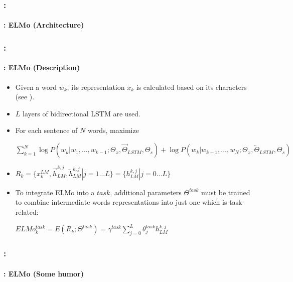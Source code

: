 \documentclass[xcolor=table]{beamer}
\begin{document}
\begin{frame}
	\frametitle{\insertshortsubtitle: \insertsection}
	\framesubtitle{\insertsubsection: ELMo (Architecture)}
	\vspace{-4pt}
	
\end{frame}

\begin{frame}
	\frametitle{\insertshortsubtitle: \insertsection}
	\framesubtitle{\insertsubsection: ELMo (Description)}

	\begin{itemize}
		\item Given a word $w_k$, its representation $x_k$ is calculated based on its characters (see \cite{2015-kim-al}).
		\item $L$ layers of bidirectional LSTM are used. 
		\item For each sentence of $N$ words, maximize\\ 
		\begin{center}
			$\sum_{k=1}^{N} 
		\log P(w_k | w_1,\ldots,w_{k-1}; \Theta_x, \overrightarrow{\Theta}_{LSTM}, \Theta_s)
		+
		\log P(w_k | w_{k+1},\ldots,w_{N}; \Theta_x, \overleftarrow{\Theta}_{LSTM}, \Theta_s)
		$
		\end{center}
		
		\item $R_k = \{x_k^{LM}, \overrightarrow{h}_{LM}^{k, j}, \overleftarrow{h}_{LM}^{k, j} | j= 1 \ldots L \}
		= \{h_{LM}^{k, j} | j= 0 \ldots L \}
		$
		
		\item To integrate ELMo into a $task$, additional parameters $\Theta^{task}$ must be trained to combine intermediate words representations into just one which is task-related:\\
		\begin{center}
			$ELMo_k^{task} = E(R_k; \Theta^{task}) = \gamma^{task} \sum_{j=0}^{L} \theta_j^{task} h_{LM}^{k, j}$
		\end{center}
	\end{itemize}

\end{frame}

\begin{frame}
	\frametitle{\insertshortsubtitle: \insertsection}
	\framesubtitle{\insertsubsection: ELMo (Some humor)}

	\begin{center}
	\end{center}
	
\end{frame}
\end{document}
